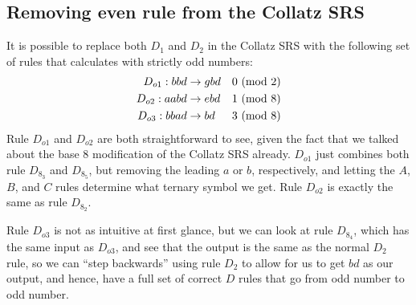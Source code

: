 \subsection{Removing even rule from the Collatz SRS}\label{subsubsec:evenruleremove}
It is possible to replace both $D_1$ and $D_2$ in the Collatz SRS with the following set of rules that calculates with strictly odd numbers:
\begin{align*}
    D_{o1}: bbd &\rightarrow gbd &\text{$0\ (\mathrm{mod}\ 2)$}\\
    D_{o2}: aabd &\rightarrow ebd &\text{$1\ (\mathrm{mod}\ 8)$}\\
    D_{o3}: bbad &\rightarrow bd &\text{$3\ (\mathrm{mod}\ 8)$}
\end{align*}
Rule $D_{o1}$ and $D_{o2}$ are both straightforward to see, given the fact that we talked about the base 8 modification of the Collatz SRS already. $D_{o1}$ just combines both rule $D_{8_3}$ and $D_{8_5}$, but removing the leading $a$ or $b$, respectively, and letting the $A$, $B$, and $C$ rules determine what ternary symbol we get. Rule $D_{o2}$ is exactly the same as rule $D_{8_2}$.\par
Rule $D_{o3}$ is not as intuitive at first glance, but we can look at rule $D_{8_4}$, which has the same input as $D_{o3}$, and see that the output is the same as the normal $D_2$ rule, so we can ``step backwards'' using rule $D_2$ to allow for us to get $bd$ as our output, and hence, have a full set of correct $D$ rules that go from odd number to odd number.
